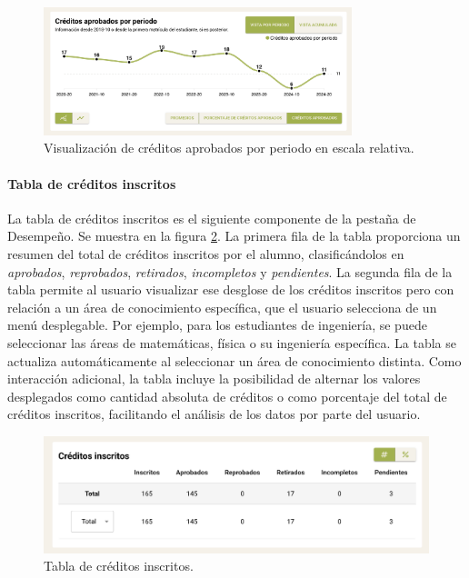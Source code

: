 \begin{enumerate}
	      \begin{figure}[H]
		      \centering
		      \includegraphics[width=0.8\textwidth]{assets/nes/creditos_periodo_relativo.png}
		      \caption{Visualización de créditos aprobados por periodo en escala relativa.}
		      \label{fig:creditos_periodo_relativo}
	      \end{figure}
\end{enumerate}

\paragraph{Tabla de créditos inscritos} La tabla de créditos inscritos es el siguiente componente de la pestaña de Desempeño. Se muestra en la figura \ref{fig:tabla_creditos}. La primera fila de la tabla proporciona un resumen del total de créditos inscritos por el alumno, clasificándolos en \textit{aprobados}, \textit{reprobados}, \textit{retirados}, \textit{incompletos} y \textit{pendientes}. La segunda fila de la tabla permite al usuario visualizar ese desglose de los créditos inscritos pero con relación a un área de conocimiento específica, que el usuario selecciona de un menú desplegable. Por ejemplo, para los estudiantes de ingeniería, se puede seleccionar las áreas de matemáticas, física o su ingeniería específica. La tabla se actualiza automáticamente al seleccionar un área de conocimiento distinta. Como interacción adicional, la tabla incluye la posibilidad de alternar los valores desplegados como  cantidad absoluta de créditos o como porcentaje del total de créditos inscritos, facilitando el análisis de los datos por parte del usuario.

\begin{figure}[H]
	\includegraphics[width=\textwidth]{assets/nes/tabla_creditos.png}
	\caption{Tabla de créditos inscritos.}
	\label{fig:tabla_creditos}
\end{figure}

